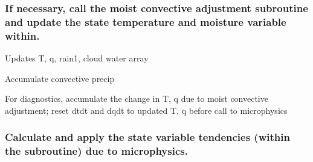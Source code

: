 \subsubsection*{If necessary, call the moist convective adjustment subroutine and update the state temperature and moisture variable within.}


\begin{DoxyItemize}
\item Updates T, q, \textquotesingle{}rain1\textquotesingle{}, cloud water array
\item Accumulate convective precip
\item For diagnostics, accumulate the change in T, q due to moist convective adjustment; reset \textquotesingle{}dtdt\textquotesingle{} and \textquotesingle{}dqdt\textquotesingle{} to updated T, q before call to microphysics
\end{DoxyItemize}

\subsubsection*{Calculate and apply the state variable tendencies (within the subroutine) due to microphysics.}



